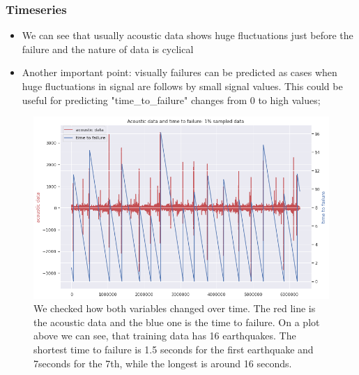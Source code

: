 \documentclass[]{llncs}
\begin{document}
\subsubsection{Timeseries}
\begin{itemize}
	\item We can see that usually acoustic data shows huge fluctuations just before the failure and the nature of data is cyclical
	\item Another important point: visually failures can be predicted as cases when huge fluctuations in signal are follows by small signal values. This could be useful for predicting "time\_to\_failure" changes from 0 to high values;
\end{itemize}
\begin{figure}[h]
	\centering
	\includegraphics[width=0.8\linewidth]{../GPUProject/timeSeries}
	\caption{We checked how both variables changed over time. The red line is the acoustic data and the blue one is the time to failure. On a plot above we can see, that training data has 16 earthquakes. The shortest time to failure is 1.5 seconds for the first earthquake and 7seconds for the 7th, while the longest is around 16 seconds.}
	\label{fig:timeseries}
\end{figure}
\end{document}
